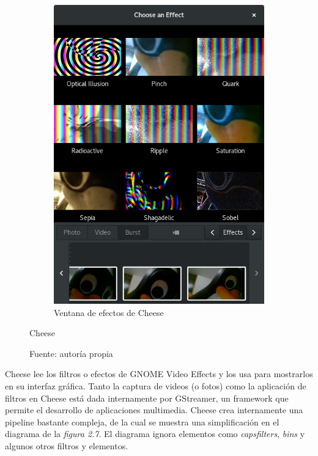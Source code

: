 \documentclass[a4paper,openright,12pt]{report}
\begin{document}
\begin{figure}
\begin{subfigure}{0.4\textwidth}
  \includegraphics[width=\textwidth]{../images/cheese-effects-grid.png}
  \caption{Ventana de efectos de Cheese}
\end{subfigure}
\caption[Hello]{Cheese}
\caption*{Fuente: autoría propia}
\end{figure}

Cheese lee los filtros o efectos de GNOME Video Effects y los usa para
mostrarlos en su interfaz gráfica. Tanto la captura de videos (o fotos) como la
aplicación de filtros en Cheese está dada internamente por GStreamer, un
framework que permite el desarrollo de aplicaciones multimedia. Cheese crea
internamente una pipeline bastante compleja, de la cual se muestra una
simplificación en el diagrama de la \textit{figura 2.7}. El diagrama ignora
elementos como \textit{capsfilters}, \textit{bins} y algunos otros filtros y
elementos.
\end{document}
